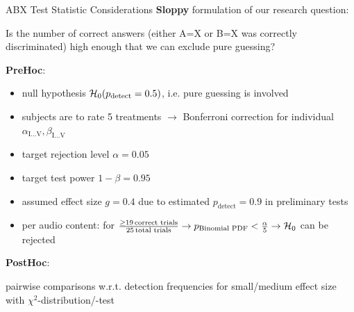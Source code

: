 \documentclass[mathserif]{intbeamer}
\begin{document}
\begin{frame}{ABX Test Statistic Considerations}
\textbf{Sloppy} formulation of our research question:

Is the number of correct answers (either A=X or B=X was correctly discriminated)
high enough that we can exclude pure guessing?
\vspace{0.25cm}

\textbf{PreHoc}:
\begin{itemize}
\item
null hypothesis $\mathcal{H}_{0}(p_\text{detect}=0.5)$, i.e. pure guessing is involved
\item
subjects are to rate 5 treatments $\rightarrow$ Bonferroni correction for individual $\alpha_\text{I...V}, \beta_\text{I...V}$
\item
target rejection level $\alpha=0.05$
\item
target test power $1-\beta = 0.95$

\item
assumed effect size $g=0.4$ due to estimated $p_\text{detect}=0.9$ in preliminary tests
\item
\textcolor{colnonzero}{per audio content}:
for $\frac{\geq 19\,\text{correct trials}}{25\,\text{total trials}}
\rightarrow p_\text{Binomial PDF}<\frac{\alpha}{5} \rightarrow\mathcal{H}_{0}$
can be rejected
\end{itemize}
%
\vspace{0.25cm}

\textbf{PostHoc}:

pairwise comparisons w.r.t. detection frequencies for small/medium effect size
with $\chi^2$-distribution/-test
\end{frame}
%
%
%
\end{document}
